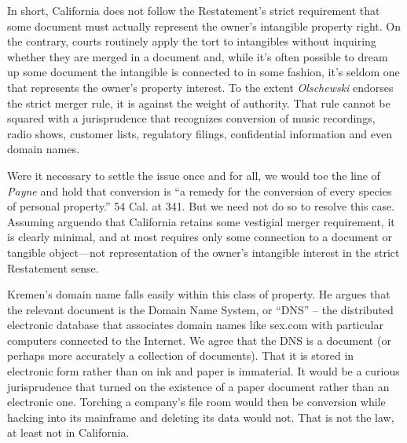 In short, California does not follow the Restatement's strict requirement that
some document must actually represent the owner's intangible property right. On
the contrary, courts routinely apply the tort to intangibles without inquiring
whether they are merged in a document and, while it's often possible to dream
up some document the intangible is connected to in some fashion, it's seldom
one that represents the owner's property interest. To the extent
\textit{Olschewski} endorses the strict merger rule, it is against the weight
of authority. That rule cannot be squared with a jurisprudence that recognizes
conversion of music recordings, radio shows, customer lists, regulatory
filings, confidential information and even domain names.

Were it necessary to settle the issue once and for all, we would toe the line of
\textit{Payne} and hold that conversion is ``a remedy for the conversion of
every species of personal property.'' 54 Cal. at 341. But we need not do so to
resolve this case. Assuming arguendo that California retains some vestigial
merger requirement, it is clearly minimal, and at most requires only some
connection to a document or tangible object---not representation of the
owner's intangible interest in the strict Restatement sense.

Kremen's domain name falls easily within this class of property. He argues that
the relevant document is the Domain Name System, or ``DNS'' -- the distributed
electronic database that associates domain names like sex.com with particular
computers connected to the Internet. We agree that the DNS is a document (or
perhaps more accurately a collection of documents). That it is stored in
electronic form rather than on ink and paper is immaterial. It would be a
curious jurisprudence that turned on the existence of a paper document rather
than an electronic one. Torching a company's file room would then be conversion
while hacking into its mainframe and deleting its data would not. That is not
the law, at least not in California.

